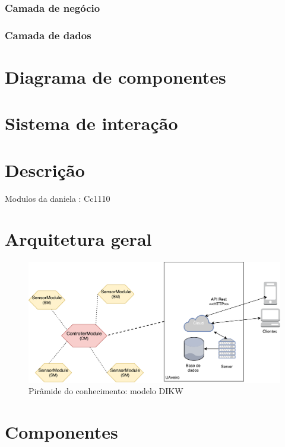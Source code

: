 \subsubsection{Camada de negócio}



\subsubsection{Camada de dados}




\section{Diagrama de componentes}




\section{Sistema de interação}


\section{Descrição}


Modulos da daniela : Cc1110



\section{Arquitetura geral}

\begin{figure}[!htb]
	\centering
	\includegraphics[scale=0.55]{esquemas/arquitetura_geral.pdf}
	\caption{Pirâmide do conhecimento: modelo DIKW}
	\label{dikw}
\end{figure}


\newpage


\section{Componentes}


